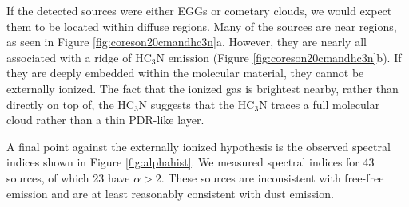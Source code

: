 \documentclass[twocolumn]{aastex61}
\begin{document}
If the detected sources were either EGGs or cometary clouds, we would expect
them to be located within diffuse \hii regions.  Many of the sources are near \hii
regions, as seen in Figure \ref{fig:coreson20cmandhc3n}a.  However, they are
nearly all associated with a ridge of HC$_3$N emission (Figure
\ref{fig:coreson20cmandhc3n}b).  If they are deeply embedded within the
molecular material, they cannot be externally ionized.  
The fact that the ionized gas is brightest nearby, rather than directly on top
of, the HC$_3$N suggests that the HC$_3$N traces a full molecular cloud rather
than a thin PDR-like layer.

A final point against the externally ionized hypothesis is the observed
spectral indices shown in Figure \ref{fig:alphahist}.  We measured spectral
indices for 43 sources, of which 23 have $\alpha>2$.  These sources are
inconsistent with free-free emission and are at least reasonably consistent
with dust emission.



% 
% 
\end{document}
